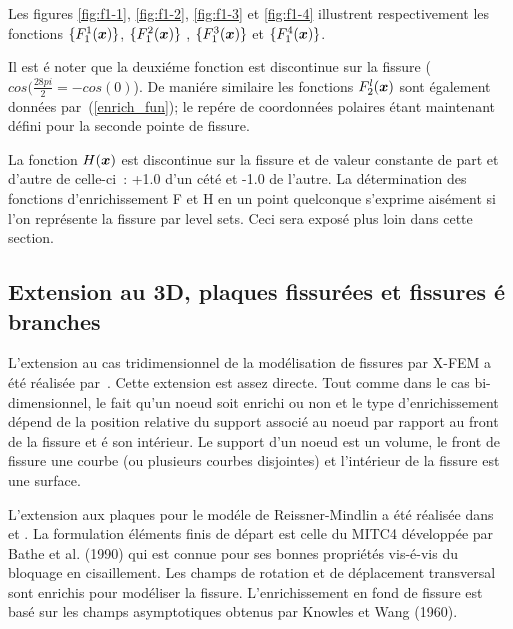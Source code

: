 Les figures \ref{fig:f1-1}, \ref{fig:f1-2}, \ref{fig:f1-3} et \ref{fig:f1-4} illustrent respectivement les fonctions
 $\{F_1^1(\mbox{\boldmath $x$})\}$, $\{F_1^2(\mbox{\boldmath $x$})\}$ , $\{F_1^3(\mbox{\boldmath $x$})\}$ et  $\{F_1^4(\mbox{\boldmath $x$})\}$.


Il est \'e noter que la deuxi\'eme fonction est discontinue sur la fissure ($cos(\frac{2 8pi}{2} = - cos(0) $).
De mani\'ere similaire les fonctions $F^l_2(\mbox{\boldmath $x$})$ sont \'egalement
donn\'ees par~(\ref{enrich_fun}); le rep\'ere de coordonn\'ees
polaires \'etant maintenant d\'efini pour la seconde pointe de fissure.









La fonction $H(\mbox{\boldmath $x$})$ est discontinue sur la fissure
et de valeur constante de part et d'autre de celle-ci~:
+1.0 d'un c\'et\'e et -1.0 de l'autre.
La d\'etermination des fonctions d'enrichissement F et H en
un point quelconque s'exprime ais\'ement si l'on repr\'esente
la fissure par level sets. Ceci sera expos\'e plus loin dans
cette section.

\subsection{Extension au 3D, plaques fissur\'ees et fissures \'e branches}
L'extension au cas tridimensionnel de la mod\'elisation de fissures
par X-FEM a \'et\'e r\'ealis\'ee par~\cite{Sukumar:3D}. Cette extension est
assez directe. Tout comme dans le cas bi-dimensionnel, le fait qu'un
noeud soit enrichi ou non et le type d'enrichissement d\'epend de la
position relative du support associ\'e au noeud par rapport au front
de la fissure et \'e son int\'erieur. Le support d'un noeud est un
volume, le front de fissure une courbe (ou plusieurs courbes
disjointes) et l'int\'erieur de la fissure est une surface.

L'extension aux plaques pour le mod\'ele de
Reissner-Mindlin a \'et\'e r\'ealis\'ee dans
~\cite{Dolbow:melosh} et \cite{Dolbow:plate2}.
La formulation \'el\'ements finis de d\'epart
est celle du MITC4 d\'evelopp\'ee par
Bathe et al. (1990)\nocite{Bathe:MITC}
qui est connue pour ses bonnes propri\'et\'es
vis-\'e-vis du bloquage en cisaillement.
Les champs de rotation et de d\'eplacement transversal
sont enrichis pour mod\'eliser
la fissure. L'enrichissement en fond de fissure
est bas\'e sur les champs asymptotiques
obtenus par Knowles et Wang (1960). \nocite{Knowles:plate}

